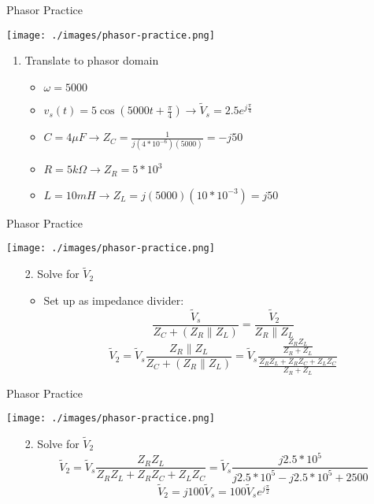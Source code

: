     \begin{frame}{Phasor Practice}
        \begin{center}
            \texttt{[image: ./images/phasor-practice.png]}
        \end{center}
        \begin{enumerate}
            \item Translate to phasor domain
            \begin{itemize}
                \item $\omega=5000$
                \item $v_s(t)=5\cos(5000t+\frac{\pi}{4})\rightarrow \tilde{V}_s=2.5e^{j\frac{\pi}{4}}$
                \item $C=4\mu F\rightarrow Z_C=\frac{1}{j(4*10^{-6})(5000)}=-j50$
                \item $R=5k\Omega\rightarrow Z_R=5*10^3$
                \item $L=10mH\rightarrow Z_L=j(5000)(10*10^{-3})=j50$
            \end{itemize}
        \end{enumerate}
    \end{frame}
    
    \begin{frame}{Phasor Practice}
        \begin{center}
            \texttt{[image: ./images/phasor-practice.png]}
        \end{center}
        \begin{enumerate}
            \item[2.] Solve for $\tilde{V}_2$
            \begin{itemize}
                \item Set up as impedance divider: $$\frac{\tilde{V}_s}{Z_C+(Z_R\| Z_L)}=\frac{\tilde{V}_2}{Z_R\| Z_L}$$
                $$\tilde{V}_2=\tilde{V}_s\frac{Z_R\|Z_L}{Z_C+(Z_R\|Z_L)}=\tilde{V}_s\frac{\frac{Z_RZ_L}{Z_R+Z_L}}{\frac{Z_RZ_L+Z_RZ_C+Z_LZ_C}{Z_R+Z_L}}$$
            \end{itemize}
        \end{enumerate}
    \end{frame}
    
    \begin{frame}{Phasor Practice}
        \begin{center}
            \texttt{[image: ./images/phasor-practice.png]}
        \end{center}
        \begin{enumerate}
            \item[2.] Solve for $\tilde{V}_2$
            $$\tilde{V}_2=\tilde{V}_s\frac{Z_RZ_L}{Z_RZ_L+Z_RZ_C+Z_LZ_C}=\tilde{V}_s\frac{j2.5*10^5}{j2.5*10^5-j2.5*10^5+2500}$$
            $$\tilde{V}_2=j100\tilde{V}_s=100\tilde{V}_se^{j\frac{\pi}{2}}$$
        \end{enumerate}
    \end{frame}
    
